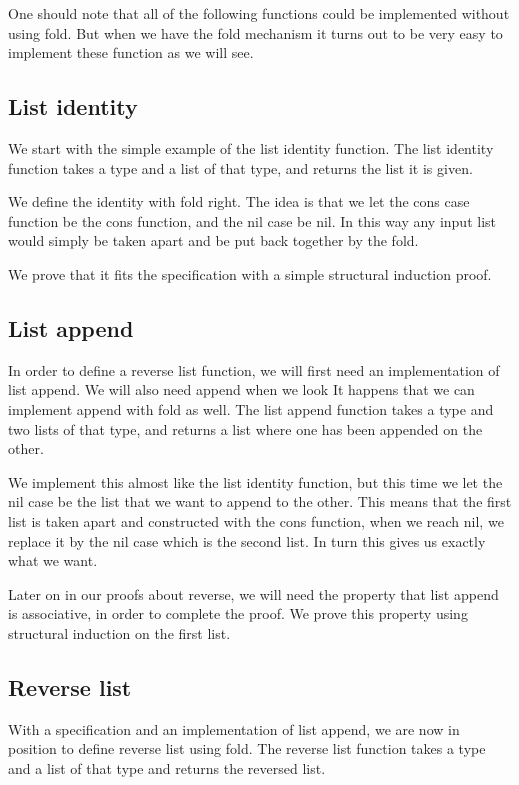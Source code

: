 \documentclass[a4paper]{article}
\begin{document}
One should note that all of the following functions could be implemented without
using fold. But when we have the fold mechanism it turns out to be very easy to
implement these function as we will see.

\subsection{List identity}
We start with the simple example of the list identity function. The list
identity function takes a type and a list of that type, and returns the list it
is given.

We define the identity with fold right. The idea is that we let the cons case
function be the cons function, and the nil case be nil. In this way any input
list would simply be taken apart and be put back together by the fold.

We prove that it fits the specification with a simple structural induction
proof.

\subsection{List append}
In order to define a reverse list function, we will first need an implementation
of list append. We will also need append when we look It happens that we can
implement append with fold as well. The list append function takes a type and
two lists of that type, and returns a list where one has been appended on the
other.

We implement this almost like the list identity function, but this time we let
the nil case be the list that we want to append to the other. This means that
the first list is taken apart and constructed with the cons function, when we
reach nil, we replace it by the nil case which is the second list. In turn this
gives us exactly what we want.

Later on in our proofs about reverse, we will need the property that list append
is associative, in order to complete the proof. We prove this property using
structural induction on the first list.

\subsection{Reverse list}
With a specification and an implementation of list append, we are now in
position to define reverse list using fold. The reverse list function takes a
type and a list of that type and returns the reversed list.
\end{document}
